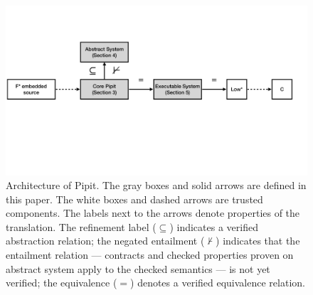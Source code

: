 \begin{figure}
  \includegraphics[width=\textwidth]{figures/core-structure.pdf}
\caption{Architecture of Pipit. The gray boxes and solid arrows are defined in this paper. The white boxes and dashed arrows are trusted components. The labels next to the arrows denote properties of the translation. The refinement label ($\subseteq$) indicates a verified abstraction relation; the negated entailment ($\not\vdash$) indicates that the entailment relation --- contracts and checked properties proven on abstract system apply to the checked semantics --- is not yet verified; the equivalence ($=$) denotes a verified equivalence relation.}
\label{f:core:structure}
\end{figure}
